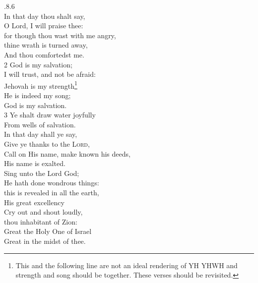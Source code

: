 \documentclass{article}
\begin{document}
\begin{multicols}{2}
.8.6\\


 In that day thou shalt say,\\
O Lord, I will praise thee:\\
for though thou wast with me angry,\\ 
thine wrath is turned away,\\
 
\noindent And thou comfortedst me.\\
2 God is my salvation; \\
I will trust, and not be afraid:\\
Jehovah is my strength\footnote{This and the following line are not an ideal rendering of YH YHWH and strength and song should be together.  These verses should be revisited.}\\

\noindent He is indeed my song;\\ 
God is my salvation.\\
3 Ye shalt draw water joyfully\\ 
From wells of salvation.\\

 In that day shall ye say,\\ 
Give ye thanks to the \textsc{Lord},\\ 
Call on His name, make known his deeds,\\
His name is exalted.\\

 Sing unto the Lord God;\\
He hath done wondrous things:\\
this is revealed in all the earth,\\
His great excellency\\

 Cry out and shout loudly,\\
thou inhabitant of Zion:\\
Great the Holy One of Israel\\
Great in the midst of thee.\\

\end{multicols}
\end{document}
